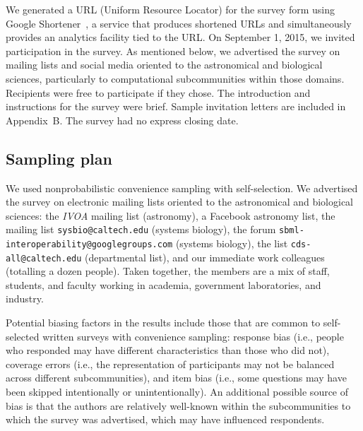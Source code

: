 \documentclass{casicswhitepaper}
\begin{document}
We generated a URL (Uniform Resource Locator) for the survey form using Google Shortener~\cite{googl}, a service that produces shortened URLs and simultaneously provides an analytics facility tied to the URL.  On September 1, 2015, we invited participation in the survey.  As mentioned below, we advertised the survey on mailing lists and social media oriented to the astronomical and biological sciences, particularly to computational subcommunities within those domains.  Recipients were free to participate if they chose.  The introduction and instructions for the survey were brief.  Sample invitation letters are included in Appendix~B.  The survey had no express closing date.


\subsection{Sampling plan}
\label{sampling-plan}

%

\newcommand{\totalPotentialRecipients}{2300\xspace}
\newcommand{\totalClicks}{172\xspace}
\newcommand{\accessRate}{7.5\%\xspace}
\newcommand{\populationResponseRate}{3\%\xspace}
\newcommand{\completionRate}{40\%\xspace}

We used nonprobabilistic convenience sampling with self-selection.  We advertised the survey on electronic mailing lists oriented to the astronomical and biological sciences: the \emph{IVOA} mailing list (astronomy), a Facebook astronomy list, the mailing list \texttt{sysbio@caltech.edu} (systems biology), the forum \texttt{sbml-interoperability@googlegroups.com} (systems biology), the list \texttt{cds-all@caltech.edu} (departmental list), and our immediate work colleagues (totalling a dozen people).  Taken together, the members are a mix of staff, students, and faculty working in academia, government laboratories, and industry.

Potential biasing factors in the results include those that are common to self-selected written surveys with convenience sampling: response bias (i.e., people who responded may have different characteristics than those who did not), coverage errors (i.e., the representation of participants may not be balanced across different subcommunities), and item bias (i.e., some questions may have been skipped intentionally or unintentionally).  An additional possible source of bias is that the authors are relatively well-known within the subcommunities to which the survey was advertised, which may have influenced respondents.  
\end{document}
